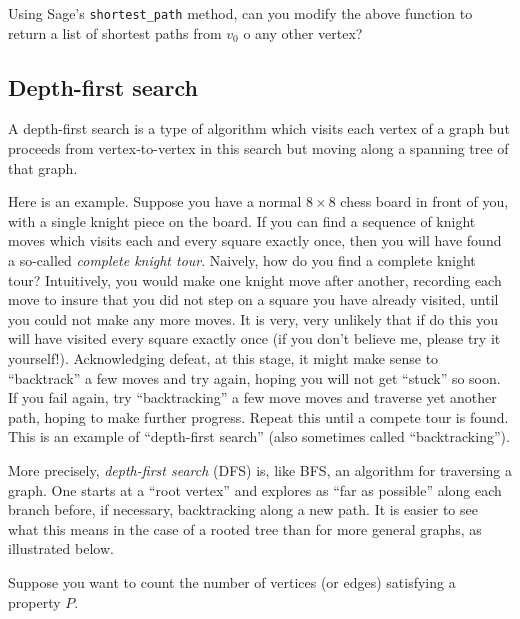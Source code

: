 \begin{exercise}
Using Sage's {\tt shortest\_path} method, can you modify the 
above function to return a list of shortest paths from 
$v_0$ o any other vertex?
\end{exercise}


\subsection{Depth-first search}

A depth-first search is a type of algorithm which visits
each vertex of a graph but proceeds from vertex-to-vertex in this
search but moving along a spanning tree of that graph.

Here is an example.
Suppose you have a normal $8\times 8$ chess board in front
of you, with a single knight piece on the board. If you can find a
sequence of knight moves which visits each and every square exactly
once, then you will have found a so-called {\it complete knight tour}.
Naively, how do you find a complete knight tour? Intuitively, you would make
one knight move after another, recording each move to insure that
you did not step on a square you have already visited, 
until you could not make any more moves.
It is very, very unlikely that if do this you will have visited every 
square exactly once
(if you don't believe me, please try it yourself!). Acknowledging defeat,
at this stage, it might make sense to ``backtrack'' a few moves and
try again, hoping you will not get ``stuck'' so soon.
If you fail again, try ``backtracking'' a few move moves
and traverse yet another path, hoping to make further progress.
Repeat this until a compete tour is found.
This is an example of ``depth-first search'' (also
sometimes called ``backtracking'').

More precisely, {\it depth-first search} (DFS) is, like BFS, an algorithm for traversing 
a graph. One starts at a ``root vertex'' and explores as ``far as possible''
along each branch before, if necessary, backtracking along a new path. It is easier to see what this 
means in the case of a rooted tree than for more general graphs, as
illustrated below.

Suppose you want to count the number of
vertices (or edges) satisfying a property $P$.

